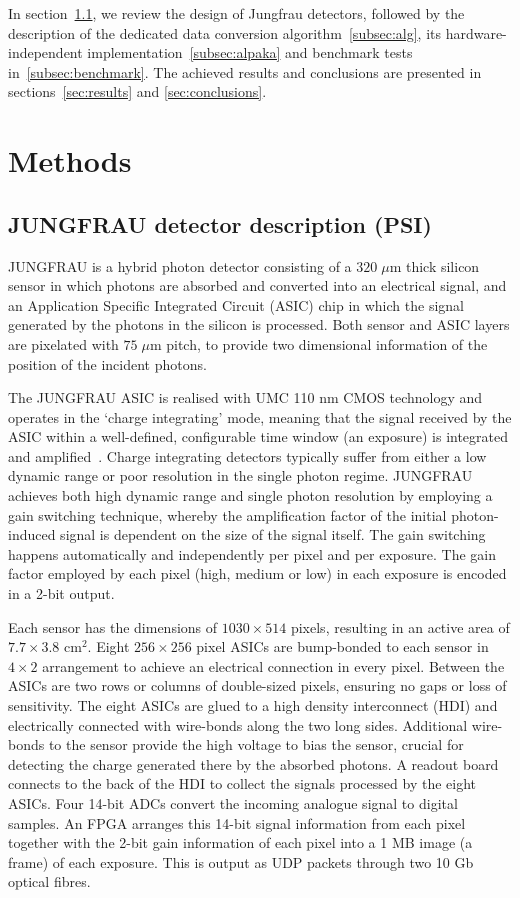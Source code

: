 \documentclass[a4paper]{article}
\begin{document}
In section~\ref{subsec:det}, we review the design of Jungfrau detectors, followed by the description of the dedicated data conversion algorithm~\ref{subsec:alg}, its hardware-independent implementation~\ref{subsec:alpaka} and benchmark tests in~\ref{subsec:benchmark}. The achieved results and conclusions are presented in sections~\ref{sec:results} and \ref{sec:conclusions}. 


\section{Methods}
\subsection{JUNGFRAU detector description (PSI)}
\label{subsec:det}
JUNGFRAU is a hybrid photon detector consisting of a $320\;\mu\mathrm{m}$ thick silicon sensor in which photons are absorbed and converted into an electrical signal, and an Application Specific Integrated Circuit (ASIC) chip in which the signal generated by the photons in the silicon is processed. Both sensor and ASIC layers are pixelated with $75\;\mu\mathrm{m}$ pitch, to provide two dimensional information of the position of the incident photons.

The JUNGFRAU ASIC is realised with UMC 110 nm CMOS technology and operates in the `charge integrating' mode, meaning that the signal received by the ASIC within a well-defined, configurable time window (an exposure) is integrated and amplified~\cite{Mozzanica_2016}. Charge integrating detectors typically suffer from either a low dynamic range or poor resolution in the single photon regime. JUNGFRAU achieves both high dynamic range and single photon resolution by employing a gain switching technique, whereby the amplification factor of the initial photon-induced signal is dependent on the size of the signal itself. The gain switching happens automatically and independently per pixel and per exposure. The gain factor employed by each pixel (high, medium or low) in each exposure is encoded in a 2-bit output.

Each sensor has the dimensions of $1030\times514$ pixels, resulting in an active area of $7.7\times3.8$ cm$^2$. Eight $256 \times 256$ pixel ASICs are bump-bonded to each sensor in $4\times2$ arrangement to achieve an electrical connection in every pixel.  Between the ASICs are two rows or columns of double-sized pixels, ensuring no gaps or loss of sensitivity. The eight ASICs are glued to a high density interconnect (HDI) and electrically connected with wire-bonds along the two long sides. Additional wire-bonds to the sensor provide the high voltage to bias the sensor, crucial for detecting the charge generated there by the absorbed photons. A readout board connects to the back of the HDI to collect the signals processed by the eight ASICs. Four 14-bit ADCs convert the incoming analogue signal to digital samples. An FPGA arranges this 14-bit signal information from each pixel together with the 2-bit gain information of each pixel into a 1 MB image (a frame) of each exposure. This is output as UDP packets through two 10 Gb optical fibres.
\end{document}
